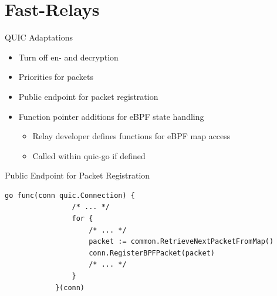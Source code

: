 \documentclass[shortpres,aspectratio=43]{beamer}
\newlength{\mylength}
\begin{document}

\section{Fast-Relays}

\begin{frame}{}
  \tableofcontents[currentsection]
\end{frame}

\begin{frame}{QUIC Adaptations}
    \begin{minipage}{\textwidth}
        \begin{itemize}
            \item Turn off en- and decryption
            \vspace{2\mylength}
            \item Priorities for packets
            \vspace{2\mylength}
            \item Public endpoint for packet registration
            \vspace{2\mylength}
            \item Function pointer additions for eBPF state handling
            \vspace{2\mylength}
            \begin{itemize}
                \item Relay developer defines functions for eBPF map access
                \vspace{2\mylength}
                \item Called within quic-go if defined
            \end{itemize}
        \end{itemize}
    \end{minipage}
\end{frame}


\begin{frame}[fragile]{Public Endpoint for Packet Registration}
    \begin{minipage}{\textwidth}
        \begin{lstlisting}[style=GoStyle,
            caption=Packet registration within relay code.]
            go func(conn quic.Connection) {
                /* ... */
                for {
                    /* ... */
                    packet := common.RetrieveNextPacketFromMap()
                    conn.RegisterBPFPacket(packet)
                    /* ... */
                }
            }(conn)
        \end{lstlisting}
    \end{minipage}
\end{frame}
\end{document}
